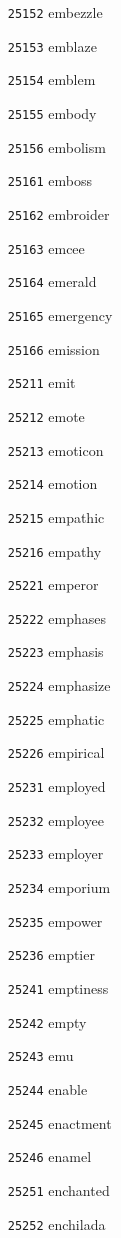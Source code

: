 \documentclass[twoside,11pt]{article}
\begin{document}
\begin{multicols}{5}
\begin{enumerate}
\item[\texttt{25152}] embezzle
\item[\texttt{25153}] emblaze
\item[\texttt{25154}] emblem
\item[\texttt{25155}] embody
\item[\texttt{25156}] embolism
\item[\texttt{25161}] emboss
\item[\texttt{25162}] embroider
\item[\texttt{25163}] emcee
\item[\texttt{25164}] emerald
\item[\texttt{25165}] emergency
\item[\texttt{25166}] emission
\item[\texttt{25211}] emit
\item[\texttt{25212}] emote
\item[\texttt{25213}] emoticon
\item[\texttt{25214}] emotion
\item[\texttt{25215}] empathic
\item[\texttt{25216}] empathy
\item[\texttt{25221}] emperor
\item[\texttt{25222}] emphases
\item[\texttt{25223}] emphasis
\item[\texttt{25224}] emphasize
\item[\texttt{25225}] emphatic
\item[\texttt{25226}] empirical
\item[\texttt{25231}] employed
\item[\texttt{25232}] employee
\item[\texttt{25233}] employer
\item[\texttt{25234}] emporium
\item[\texttt{25235}] empower
\item[\texttt{25236}] emptier
\item[\texttt{25241}] emptiness
\item[\texttt{25242}] empty
\item[\texttt{25243}] emu
\item[\texttt{25244}] enable
\item[\texttt{25245}] enactment
\item[\texttt{25246}] enamel
\item[\texttt{25251}] enchanted
\item[\texttt{25252}] enchilada

\end{enumerate}
\end{multicols}
\end{document}
